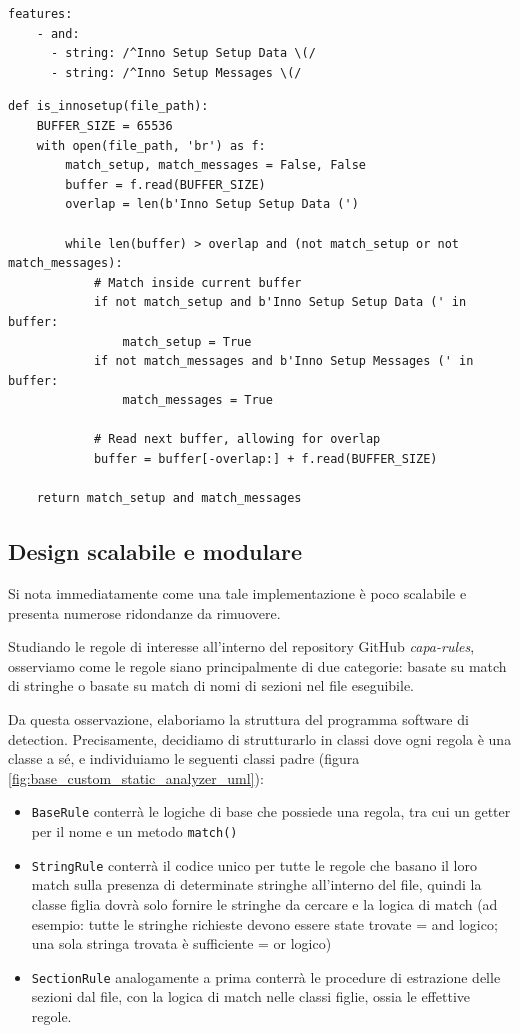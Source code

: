\begin{minipage}[]{\linewidth}
\begin{verbatim}
features:
    - and:
      - string: /^Inno Setup Setup Data \(/
      - string: /^Inno Setup Messages \(/
\end{verbatim}
\end{minipage}

\begin{verbatim}
def is_innosetup(file_path):
    BUFFER_SIZE = 65536
    with open(file_path, 'br') as f:
        match_setup, match_messages = False, False
        buffer = f.read(BUFFER_SIZE)
        overlap = len(b'Inno Setup Setup Data (')

        while len(buffer) > overlap and (not match_setup or not match_messages):
            # Match inside current buffer
            if not match_setup and b'Inno Setup Setup Data (' in buffer:
                match_setup = True
            if not match_messages and b'Inno Setup Messages (' in buffer:
                match_messages = True
            
            # Read next buffer, allowing for overlap
            buffer = buffer[-overlap:] + f.read(BUFFER_SIZE)
    
    return match_setup and match_messages
\end{verbatim}

\subsection{Design scalabile e modulare}
Si nota immediatamente come una tale implementazione è poco scalabile e presenta numerose ridondanze da rimuovere.

Studiando le regole di interesse all'interno del repository GitHub \textit{capa-rules}, osserviamo come le regole siano principalmente di due categorie: basate su match di stringhe o basate su match di nomi di sezioni nel file eseguibile.

Da questa osservazione, elaboriamo la struttura del programma software di detection. Precisamente, decidiamo di strutturarlo in classi dove ogni regola è una classe a sé, e individuiamo le seguenti classi padre (figura \ref{fig:base_custom_static_analyzer_uml}):
\begin{itemize}
    \item \texttt{BaseRule} conterrà le logiche di base che possiede una regola, tra cui un getter per il nome e un metodo \texttt{match()}
    \item \texttt{StringRule} conterrà il codice unico per tutte le regole che basano il loro match sulla presenza di determinate stringhe all'interno del file, quindi la classe figlia dovrà solo fornire le stringhe da cercare e la logica di match (ad esempio: tutte le stringhe richieste devono essere state trovate = and logico; una sola stringa trovata è sufficiente = or logico)
    \item \texttt{SectionRule} analogamente a prima conterrà le procedure di estrazione delle sezioni dal file, con la logica di match nelle classi figlie, ossia le effettive regole.
\end{itemize}

